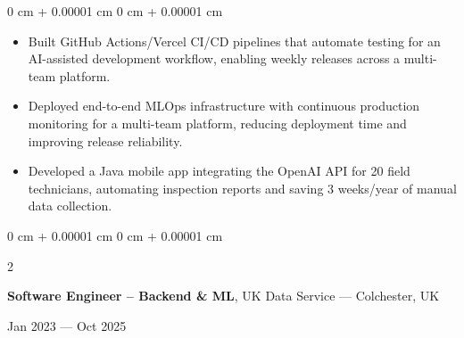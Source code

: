 \documentclass[6pt, letterpaper]{article}
\newenvironment{highlights}{
    \begin{itemize}[
        topsep=0.03 cm,
        parsep=0.03 cm,
        partopsep=0pt,
        itemsep=0pt,
        leftmargin=0 cm + 10pt
    ]
}{
    \end{itemize}
} %
\newenvironment{onecolentry}{
    \begin{adjustwidth}{
        0 cm + 0.00001 cm
    }{
        0 cm + 0.00001 cm
    }
}{
    \end{adjustwidth}
} %
\newenvironment{twocolentry}[2][]{
    \onecolentry
    \def\secondColumn{#2}
    \setcolumnwidth{\fill, 4.5 cm}
    \begin{paracol}{2}
}{
    \switchcolumn \raggedleft \secondColumn
    \end{paracol}
    \endonecolentry
} %
\begin{document}
        \begin{onecolentry}
        \begin{highlights}

            \item Built GitHub Actions/Vercel CI/CD pipelines that automate testing for an AI-assisted development workflow, enabling weekly releases across a multi-team platform.
            \item Deployed end-to-end MLOps infrastructure with continuous production monitoring for a multi-team platform, reducing deployment time and improving release reliability.
            \item Developed a Java mobile app integrating the OpenAI API for 20 field technicians, automating inspection reports and saving 3 weeks/year of manual data collection.

        \end{highlights}
        \end{onecolentry}

        \begin{twocolentry}{Jan 2023 --- Oct 2025}
            \textbf{Software Engineer – Backend \& ML}, UK Data Service --- Colchester, UK
        \end{twocolentry}
\end{document}
